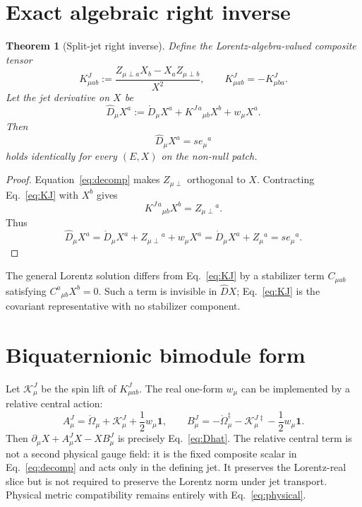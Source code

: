 \documentclass[11pt,a4paper]{article}
\newtheorem{theorem}{Theorem}
\newcommand{\dd}{\ddagger}
\begin{document}
\section{Exact algebraic right inverse}
\begin{theorem}[Split-jet right inverse]
Define the Lorentz-algebra-valued composite tensor
\begin{equation}
 \boxed{
 K^J_{\mu ab}:=
 \frac{Z_{\mu\perp a}X_b-X_aZ_{\mu\perp b}}{X^2},
 \qquad K^J_{\mu ab}=-K^J_{\mu ba}.}
 \label{eq:KJ}
\end{equation}
Let the jet derivative on $X$ be
\begin{equation}
 \widehat D_\mu X^a
 :=\mathring D_\mu X^a+K^{J\,a}{}_{\mu b}X^b+w_\mu X^a.
 \label{eq:Dhat}
\end{equation}
Then
\begin{equation}
 \boxed{\widehat D_\mu X^a=s e_\mu{}^a}
 \label{eq:rightinverse}
\end{equation}
holds identically for every $(E,X)$ on the non-null patch.
\end{theorem}

\begin{proof}
Equation~\eqref{eq:decomp} makes $Z_{\mu\perp}$ orthogonal to $X$.
Contracting Eq.~\eqref{eq:KJ} with $X^b$ gives
\begin{equation}
 K^{J\,a}{}_{\mu b}X^b
 =Z_{\mu\perp}{}^a.
\end{equation}
Thus
\begin{equation}
 \widehat D_\mu X^a
 =\mathring D_\mu X^a+Z_{\mu\perp}{}^a+w_\mu X^a
 =\mathring D_\mu X^a+Z_\mu{}^a
 =s e_\mu{}^a.
\end{equation}
\end{proof}

The general Lorentz solution differs from Eq.~\eqref{eq:KJ} by a stabilizer
term $C_{\mu ab}$ satisfying $C^a{}_{\mu b}X^b=0$.  Such a term is invisible in
$\widehat D X$; Eq.~\eqref{eq:KJ} is the covariant representative with no
stabilizer component.

\section{Biquaternionic bimodule form}
Let $\mathcal K^J_\mu$ be the spin lift of $K^J_{\mu ab}$.  The real one-form
$w_\mu$ can be implemented by a relative central action:
\begin{equation}
 A^J_\mu=\mathring\Omega_\mu+\mathcal K^J_\mu+\frac12w_\mu\mathbf1,
 \qquad
 B^J_\mu=-\mathring\Omega_\mu^{\dd}-\mathcal K_\mu^{J\dd}
          -\frac12w_\mu\mathbf1.
 \label{eq:AB}
\end{equation}
Then $\partial_\mu X+A^J_\mu X-XB^J_\mu$ is precisely
Eq.~\eqref{eq:Dhat}.  The relative central term is not a second physical gauge
field: it is the fixed composite scalar in Eq.~\eqref{eq:decomp} and acts only
in the defining jet.  It preserves the Lorentz-real slice but is not required
to preserve the Lorentz norm under jet transport.  Physical metric
compatibility remains entirely with Eq.~\eqref{eq:physical}.
\end{document}
